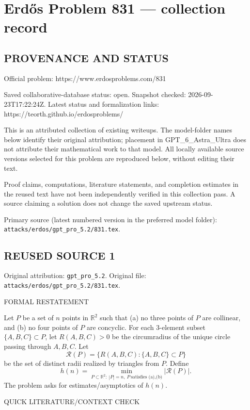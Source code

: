\section*{Erd\H{o}s Problem 831 --- collection record}

\subsection*{PROVENANCE AND STATUS}
Official problem: https://www.erdosproblems.com/831

Saved collaborative-database status: open.
Snapshot checked: 2026-09-23T17:22:24Z.
Latest status and formalization links: https://teorth.github.io/erdosproblems/

This is an attributed collection of existing writeups. The model-folder names below identify their original attribution; placement in GPT\_6\_Astra\_Ultra does not attribute their mathematical work to that model. All locally available source versions selected for this problem are reproduced below, without editing their text.

Proof claims, computations, literature statements, and completion estimates in the reused text have not been independently verified in this collection pass. A source claiming a solution does not change the saved upstream status.

Primary source (latest numbered version in the preferred model folder): \texttt{attacks/erdos/gpt\_pro\_5.2/831.tex}.

\subsection*{REUSED SOURCE 1}
Original attribution: \texttt{gpt\_pro\_5.2}.
Original file: \texttt{attacks/erdos/gpt\_pro\_5.2/831.tex}.


FORMAL RESTATEMENT

Let $P$ be a set of $n$ points in $\mathbb{R}^2$ such that
(a) no three points of $P$ are collinear, and
(b) no four points of $P$ are concyclic.
For each 3-element subset $\{A,B,C\}\subset P$, let $R(A,B,C)>0$ be the circumradius of the unique circle passing through $A,B,C$.
Let
\[
\mathcal{R}(P)=\{R(A,B,C): \{A,B,C\}\subset P\}
\]
be the set of distinct radii realized by triangles from $P$.
Define
\[
 h(n)=\min_{P\subset\mathbb{R}^2:\ |P|=n,\ P\ \text{satisfies (a),(b)}} |\mathcal{R}(P)|.
\]
The problem asks for estimates/asymptotics of $h(n)$.

QUICK LITERATURE/CONTEXT CHECK

